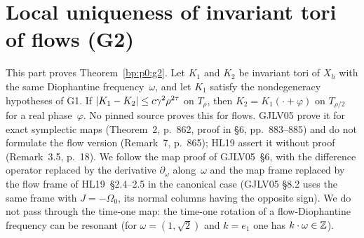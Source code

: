 \section{Local uniqueness of invariant tori of flows (G2)}\label{bp:p3}

This part proves Theorem~\ref{bp:p0:g2}. Let $K_1$ and $K_2$ be invariant tori of $X_h$ with the same
Diophantine frequency~$\omega$, and let $K_1$ satisfy the nondegeneracy hypotheses of G1. If
$\lvert K_1-K_2\rvert\le c\gamma^2\rho^{2\tau}$ on $T_\rho$, then $K_2=K_1(\cdot+\varphi)$ on $T_{\rho/2}$ for a
real phase~$\varphi$. No pinned source proves this for flows. GJLV05 prove it for exact symplectic maps
(Theorem~2, p.~862, proof in \S6, pp.~883--885) and do not formulate the flow version (Remark~7,
p.~865); HL19 assert it without proof (Remark~3.5, p.~18). We follow the map proof of GJLV05~\S6, with
the difference operator replaced by the derivative $\partial_\omega$ along~$\omega$ and the map frame
replaced by the flow frame of HL19~\S2.4--2.5 in the canonical case (GJLV05 \S8.2 uses the same frame
with $J=-\Omega_0$, its normal columns having the opposite sign). We do not pass through the
time-one map: the time-one rotation of a flow-Diophantine frequency can be resonant (for
$\omega=(1,\sqrt2)$ and $k=e_1$ one has $k\cdot\omega\in\mathbb{Z}$).

